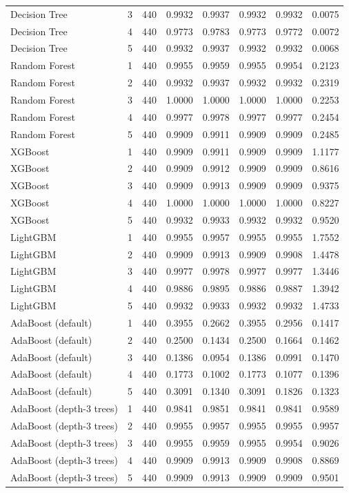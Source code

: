 \begin{tabular}{lrrrrrrr}
Decision Tree & 3 & 440 & 0.9932 & 0.9937 & 0.9932 & 0.9932 & 0.0075 \\
Decision Tree & 4 & 440 & 0.9773 & 0.9783 & 0.9773 & 0.9772 & 0.0072 \\
Decision Tree & 5 & 440 & 0.9932 & 0.9937 & 0.9932 & 0.9932 & 0.0068 \\
Random Forest & 1 & 440 & 0.9955 & 0.9959 & 0.9955 & 0.9954 & 0.2123 \\
Random Forest & 2 & 440 & 0.9932 & 0.9937 & 0.9932 & 0.9932 & 0.2319 \\
Random Forest & 3 & 440 & 1.0000 & 1.0000 & 1.0000 & 1.0000 & 0.2253 \\
Random Forest & 4 & 440 & 0.9977 & 0.9978 & 0.9977 & 0.9977 & 0.2454 \\
Random Forest & 5 & 440 & 0.9909 & 0.9911 & 0.9909 & 0.9909 & 0.2485 \\
XGBoost & 1 & 440 & 0.9909 & 0.9911 & 0.9909 & 0.9909 & 1.1177 \\
XGBoost & 2 & 440 & 0.9909 & 0.9912 & 0.9909 & 0.9909 & 0.8616 \\
XGBoost & 3 & 440 & 0.9909 & 0.9913 & 0.9909 & 0.9909 & 0.9375 \\
XGBoost & 4 & 440 & 1.0000 & 1.0000 & 1.0000 & 1.0000 & 0.8227 \\
XGBoost & 5 & 440 & 0.9932 & 0.9933 & 0.9932 & 0.9932 & 0.9520 \\
LightGBM & 1 & 440 & 0.9955 & 0.9957 & 0.9955 & 0.9955 & 1.7552 \\
LightGBM & 2 & 440 & 0.9909 & 0.9913 & 0.9909 & 0.9908 & 1.4478 \\
LightGBM & 3 & 440 & 0.9977 & 0.9978 & 0.9977 & 0.9977 & 1.3446 \\
LightGBM & 4 & 440 & 0.9886 & 0.9895 & 0.9886 & 0.9887 & 1.3942 \\
LightGBM & 5 & 440 & 0.9932 & 0.9933 & 0.9932 & 0.9932 & 1.4733 \\
AdaBoost (default) & 1 & 440 & 0.3955 & 0.2662 & 0.3955 & 0.2956 & 0.1417 \\
AdaBoost (default) & 2 & 440 & 0.2500 & 0.1434 & 0.2500 & 0.1664 & 0.1462 \\
AdaBoost (default) & 3 & 440 & 0.1386 & 0.0954 & 0.1386 & 0.0991 & 0.1470 \\
AdaBoost (default) & 4 & 440 & 0.1773 & 0.1002 & 0.1773 & 0.1077 & 0.1396 \\
AdaBoost (default) & 5 & 440 & 0.3091 & 0.1340 & 0.3091 & 0.1826 & 0.1323 \\
AdaBoost (depth-3 trees) & 1 & 440 & 0.9841 & 0.9851 & 0.9841 & 0.9841 & 0.9589 \\
AdaBoost (depth-3 trees) & 2 & 440 & 0.9955 & 0.9957 & 0.9955 & 0.9955 & 0.9957 \\
AdaBoost (depth-3 trees) & 3 & 440 & 0.9955 & 0.9959 & 0.9955 & 0.9954 & 0.9026 \\
AdaBoost (depth-3 trees) & 4 & 440 & 0.9909 & 0.9913 & 0.9909 & 0.9908 & 0.8869 \\
AdaBoost (depth-3 trees) & 5 & 440 & 0.9909 & 0.9913 & 0.9909 & 0.9909 & 0.9501 \\
\bottomrule
\end{tabular}
